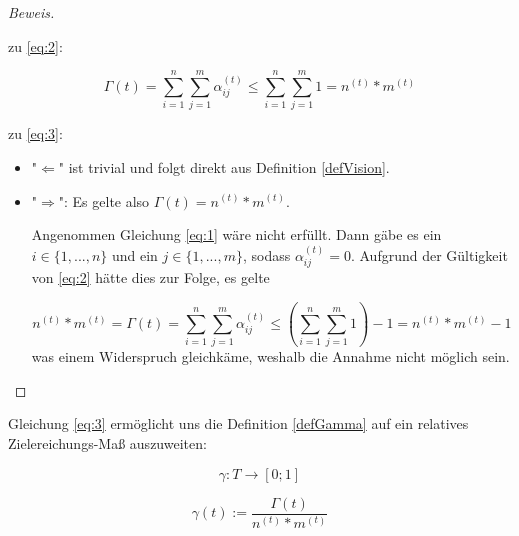\documentclass[11pt]{scrartcl}
\begin{document}
\begin{proof}[Beweis] \textrm{ }

\vspace{0.3cm}

  zu \eqref{eq:2}: 
  
\begin{equation*}
  \Gamma(t) = \sum_{i=1}^n \sum_{j=1}^m \alpha^{(t)}_{ij} \leq \sum_{i=1}^n \sum_{j=1}^m 1 = n^{(t)} * m^{(t)}
\end{equation*}

\vspace{0.3cm} 

zu \eqref{eq:3}: 

\begin{itemize}
  \item "$\Leftarrow$" ist trivial und folgt direkt aus Definition \ref{defVision}.
  \item "$\Rightarrow$": Es gelte also $\Gamma(t) = n^{(t)} * m^{(t)}$.
  
  Angenommen Gleichung \eqref{eq:1} wäre nicht erfüllt. Dann gäbe es ein $i \in \{1,...,n\}$ und ein $j \in \{1,...,m\}$, sodass $\alpha^{(t)}_{ij} = 0$. Aufgrund der Gültigkeit von \eqref{eq:2} hätte dies zur Folge, es gelte
  
\begin{equation*}
  n^{(t)} * m^{(t)} = \Gamma(t) = \sum_{i=1}^n \sum_{j=1}^m \alpha^{(t)}_{ij} \leq (\sum_{i=1}^n \sum_{j=1}^m 1) - 1 = n^{(t)} * m^{(t)} - 1
\end{equation*}  
was einem Widerspruch gleichkäme, weshalb die Annahme nicht möglich sein.
  
\end{itemize}
  
\end{proof}

\vspace{0.3cm}

Gleichung \eqref{eq:3} ermöglicht uns die Definition \ref{defGamma} auf ein relatives Zielereichungs-Maß auszuweiten:

\vspace{0.3cm}

\begin{Def}\label{defKleinGamma}
\begin{equation*}
  \gamma : T \rightarrow [0; 1] 
\end{equation*}

\begin{equation*}
  \gamma(t):= \frac{\Gamma(t)}{n^{(t)} * m^{(t)}}
\end{equation*}

\end{Def}
\end{document}
